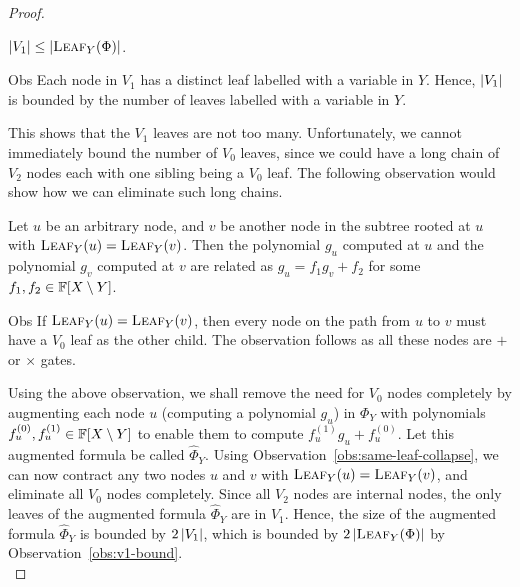 \documentclass[12pt]{report}
\begin{document}
\begin{proof}
  \begin{observation}\label{obs:v1-bound}$\left|V_1\right| \leq \left|\textsc{Leaf}_Y(\Phi)\right|$.    
  \end{observation}
  \begin{myproof}{Obs}
    Each node in $V_1$ has a distinct leaf labelled with a variable in
    $Y$. Hence, $\left|V_1\right|$ is bounded by the number of leaves
    labelled with a variable in $Y$.
  \end{myproof}
  
  This shows that the $V_1$ leaves are not too many. Unfortunately, we
  cannot immediately bound the number of $V_0$ leaves, since we could
  have a long chain of $V_2$ nodes each with one sibling being a $V_0$
  leaf. The following observation would show how we can eliminate such
  long chains.

  \begin{observation}\label{obs:same-leaf-collapse}
    Let $u$ be an arbitrary node, and $v$ be another node in the
    subtree rooted at $u$ with $\textsc{Leaf}_Y(u) =
    \textsc{Leaf}_Y(v)$. Then the polynomial $g_u$ computed at $u$ and
    the polynomial $g_v$ computed at $v$ are related as $g_u = f_1 g_v
    + f_2$ for some $f_1,f_2 \in \mathbb{F}[X\setminus Y]$.
  \end{observation}
  \begin{myproof}{Obs}
    If $\textsc{Leaf}_Y(u) =\textsc{Leaf}_Y(v)$, then every node on
    the path from $u$ to $v$ must have a $V_0$ leaf as the other child. The
    observation follows as all these nodes are $+$ or $\times$ gates.
  \end{myproof}

  Using the above observation, we shall remove the need for $V_0$
  nodes completely by augmenting each node $u$ (computing a polynomial
  $g_u$) in $\Phi_Y$ with polynomials $f_u^{(0)}, f_u^{(1)} \in \mathbb{F}[X\setminus Y]$
  to enable them to compute $f_u^{(1)}g_u + f_u^{(0)}$. Let this augmented formula be called $\hat{\Phi}_Y$. Using
  Observation~\ref{obs:same-leaf-collapse}, we can now contract any
  two nodes $u$ and $v$ with $\textsc{Leaf}_Y(u) =
  \textsc{Leaf}_Y(v)$, and eliminate all $V_0$ nodes
  completely. Since all $V_2$ nodes are internal nodes, the only leaves of the augmented formula $\hat{\Phi}_Y$ are in $V_1$. Hence, the size of the augmented formula $\hat{\Phi}_Y$ is  bounded by $2\left|V_1\right|$, which is bounded by
  $2\left|\textsc{Leaf}_Y(\Phi)\right|$ by Observation~\ref{obs:v1-bound}.\\


\end{proof}
\end{document}
